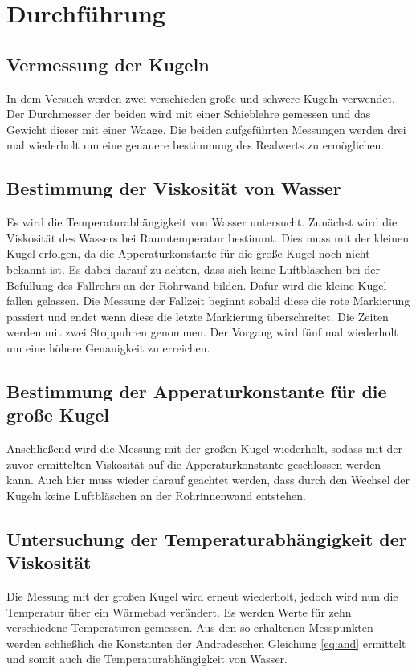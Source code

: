 \section{Durchführung}
\label{sec:Durchführung}
\subsection{Vermessung der Kugeln}
In dem Versuch werden zwei verschieden große und schwere Kugeln verwendet.
Der Durchmesser der beiden wird mit einer Schieblehre gemessen und das Gewicht dieser mit einer Waage.
Die beiden aufgeführten Messungen werden drei mal wiederholt um eine genauere bestimmung des Realwerts zu ermöglichen.
\subsection{Bestimmung der Viskosität von Wasser}
Es wird die Temperaturabhängigkeit von Wasser untersucht.
Zunächst wird die Viskosität des Wassers bei Raumtemperatur bestimmt. Dies muss mit der kleinen Kugel erfolgen,
da die Apperaturkonstante für die große Kugel noch nicht bekannt ist. Es dabei darauf zu achten, dass sich keine Luftbläschen bei der Befüllung des Fallrohrs an der Rohrwand bilden.
Dafür wird die kleine Kugel fallen gelassen.
Die Messung der Fallzeit beginnt sobald diese die rote Markierung passiert und endet wenn diese die letzte Markierung überschreitet.
Die Zeiten werden mit zwei Stoppuhren genommen.
Der Vorgang wird fünf mal wiederholt um eine höhere Genauigkeit zu erreichen.
\subsection{Bestimmung der Apperaturkonstante für die große Kugel}
Anschließend wird die Messung mit der großen Kugel
wiederholt, sodass mit der zuvor ermittelten Viskosität auf die Apperaturkonstante geschlossen werden kann.
Auch hier muss wieder darauf geachtet werden, dass durch den Wechsel der Kugeln keine Luftbläschen an der Rohrinnenwand entstehen.
\subsection{Untersuchung der Temperaturabhängigkeit der Viskosität}
Die Messung mit der großen Kugel wird erneut wiederholt, jedoch wird nun die Temperatur über ein Wärmebad verändert.
Es werden Werte für zehn verschiedene Temperaturen gemessen.
Aus den so erhaltenen Messpunkten werden schließlich die Konstanten der Andradeschen Gleichung \eqref{eq:and} ermittelt
und somit auch die Temperaturabhängigkeit von Wasser.

